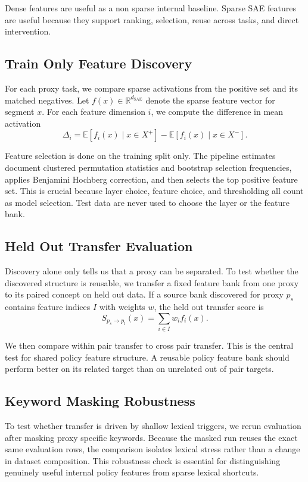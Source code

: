﻿\documentclass{article}
\begin{document}
Dense features are useful as a non sparse internal baseline. Sparse SAE features are useful because they support ranking, selection, reuse across tasks, and direct intervention.

\subsection{Train Only Feature Discovery}
For each proxy task, we compare sparse activations from the positive set and its matched negatives. Let $f(x) \in \mathbb{R}^{d_{\mathrm{SAE}}}$ denote the sparse feature vector for segment $x$. For each feature dimension $i$, we compute the difference in mean activation
\begin{equation}
\Delta_i = \mathbb{E}[f_i(x) \mid x \in X^{+}] - \mathbb{E}[f_i(x) \mid x \in X^{-}].
\end{equation}

Feature selection is done on the training split only. The pipeline estimates document clustered permutation statistics and bootstrap selection frequencies, applies Benjamini Hochberg correction, and then selects the top positive feature set. This is crucial because layer choice, feature choice, and thresholding all count as model selection. Test data are never used to choose the layer or the feature bank.

\subsection{Held Out Transfer Evaluation}
Discovery alone only tells us that a proxy can be separated. To test whether the discovered structure is reusable, we transfer a fixed feature bank from one proxy to its paired concept on held out data. If a source bank discovered for proxy $p_s$ contains feature indices $I$ with weights $w$, the held out transfer score is
\begin{equation}
S_{p_s \rightarrow p_t}(x) = \sum_{i \in I} w_i f_i(x).
\end{equation}

We then compare within pair transfer to cross pair transfer. This is the central test for shared policy feature structure. A reusable policy feature bank should perform better on its related target than on unrelated out of pair targets.

\subsection{Keyword Masking Robustness}
To test whether transfer is driven by shallow lexical triggers, we rerun evaluation after masking proxy specific keywords. Because the masked run reuses the exact same evaluation rows, the comparison isolates lexical stress rather than a change in dataset composition. This robustness check is essential for distinguishing genuinely useful internal policy features from sparse lexical shortcuts.
\end{document}
